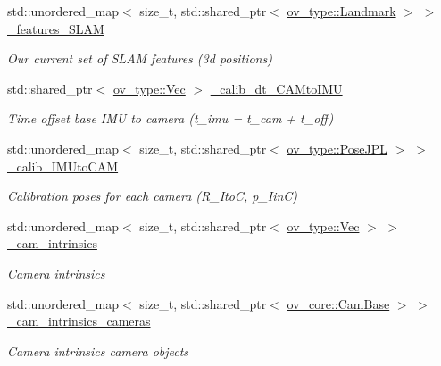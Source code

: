 \begin{DoxyCompactItemize}
\mbox{\label{classov__msckf_1_1State_ac08dc6bd1557fd4c3639d5eb2a998cb4}} 
std\+::unordered\+\_\+map$<$ size\+\_\+t, std\+::shared\+\_\+ptr$<$ \hyperlink{classov__type_1_1Landmark}{ov\+\_\+type\+::\+Landmark} $>$ $>$ \hyperlink{classov__msckf_1_1State_ac08dc6bd1557fd4c3639d5eb2a998cb4}{\+\_\+features\+\_\+\+S\+L\+AM}
\begin{DoxyCompactList}\small\item\em Our current set of S\+L\+AM features (3d positions) \end{DoxyCompactList}\item 
\mbox{\label{classov__msckf_1_1State_a0ef68be4e06e4b4947c86852d1005893}} 
std\+::shared\+\_\+ptr$<$ \hyperlink{classov__type_1_1Vec}{ov\+\_\+type\+::\+Vec} $>$ \hyperlink{classov__msckf_1_1State_a0ef68be4e06e4b4947c86852d1005893}{\+\_\+calib\+\_\+dt\+\_\+\+C\+A\+Mto\+I\+MU}
\begin{DoxyCompactList}\small\item\em Time offset base I\+MU to camera (t\+\_\+imu = t\+\_\+cam + t\+\_\+off) \end{DoxyCompactList}\item 
\mbox{\label{classov__msckf_1_1State_a61797fa8310111f413c5c5b45c19460b}} 
std\+::unordered\+\_\+map$<$ size\+\_\+t, std\+::shared\+\_\+ptr$<$ \hyperlink{classov__type_1_1PoseJPL}{ov\+\_\+type\+::\+Pose\+J\+PL} $>$ $>$ \hyperlink{classov__msckf_1_1State_a61797fa8310111f413c5c5b45c19460b}{\+\_\+calib\+\_\+\+I\+M\+Uto\+C\+AM}
\begin{DoxyCompactList}\small\item\em Calibration poses for each camera (R\+\_\+\+ItoC, p\+\_\+\+IinC) \end{DoxyCompactList}\item 
\mbox{\label{classov__msckf_1_1State_a5323d1f31a15c9b54b6696ffb5db353f}} 
std\+::unordered\+\_\+map$<$ size\+\_\+t, std\+::shared\+\_\+ptr$<$ \hyperlink{classov__type_1_1Vec}{ov\+\_\+type\+::\+Vec} $>$ $>$ \hyperlink{classov__msckf_1_1State_a5323d1f31a15c9b54b6696ffb5db353f}{\+\_\+cam\+\_\+intrinsics}
\begin{DoxyCompactList}\small\item\em Camera intrinsics \end{DoxyCompactList}\item 
\mbox{\label{classov__msckf_1_1State_af66308da3cab5bcc0098aadd5a16e874}} 
std\+::unordered\+\_\+map$<$ size\+\_\+t, std\+::shared\+\_\+ptr$<$ \hyperlink{classov__core_1_1CamBase}{ov\+\_\+core\+::\+Cam\+Base} $>$ $>$ \hyperlink{classov__msckf_1_1State_af66308da3cab5bcc0098aadd5a16e874}{\+\_\+cam\+\_\+intrinsics\+\_\+cameras}
\begin{DoxyCompactList}\small\item\em Camera intrinsics camera objects \end{DoxyCompactList}\end{DoxyCompactItemize}
